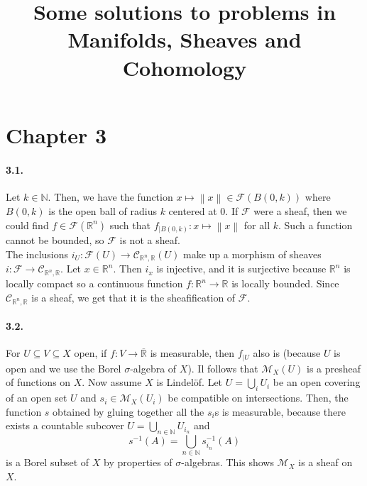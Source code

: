 \documentclass{article}
\title{Some solutions to problems in Manifolds, Sheaves and Cohomology}
\author{}
\date{}
\newcommand{\N}{\mathbb{N}}
\newcommand{\R}{\mathbb{R}}
\newcommand{\F}{\mathcal{F}}
\newcommand{\cont}{\mathcal{C}}
\newcommand{\norm}[1]{\left\lVert #1 \right\rVert}
\begin{document}
\maketitle

\section{Chapter 3}

\paragraph{3.1.} Let $k \in \N$. Then, we have the function $x \mapsto \norm{x} \in \F(B(0,k))$ where $B(0,k)$ is the open ball of radius $k$ centered at $0$. If $\F$ were a sheaf, then we could find $f \in \F(\R^n)$ such that $f_{\mid B(0,k)} : x \mapsto \norm{x}$ for all $k$. Such a function cannot be bounded, so $\F$ is not a sheaf. \\
The inclusions $i_U : \F(U) \to \cont_{\R^n,\R}(U)$ make up a morphism of sheaves $i : \F \to \cont_{\R^n,\R}$. Let $x \in \R^n$. Then $i_x$ is injective, and it is surjective because $\R^n$ is locally compact so a continuous function $f : \R^n\to \R$ is locally bounded. Since $\cont_{\R^n,\R}$ is a sheaf, we get that it is the sheafification of $\F$.

\paragraph{3.2.}  For $U \subseteq V \subseteq X$ open, if $f : V \to \overline{\R}$ is measurable, then $f_{\mid U}$ also is (because $U$ is open and we use the Borel $\sigma$-algebra of $X$). Il follows that $\mathcal{M}_X(U)$ is a presheaf of functions on $X$. Now assume $X$ is Lindelöf. Let $U = \bigcup_i U_i$ be an open covering of an open set $U$ and $s_i \in \mathcal{M}_X(U_i)$ be compatible on intersections. Then, the function $s$ obtained by gluing together all the $s_i$s is measurable, because there exists a countable subcover $U = \bigcup_{n \in \N} U_{i_n}$ and
\[s^{-1} (A) = \bigcup_{n\in \N} s_{i_n}^{-1}(A)\]
is a Borel subset of $X$ by properties of $\sigma$-algebras. This shows $\mathcal{M}_X$ is a sheaf on $X$.
\end{document}
